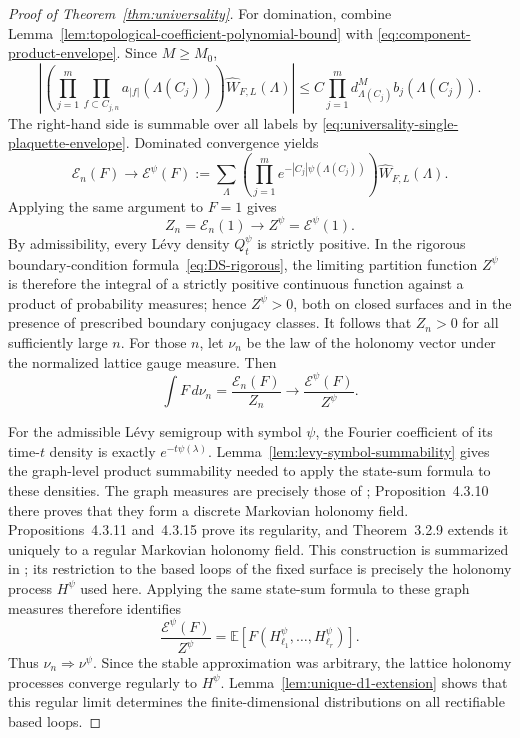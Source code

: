 \documentclass[11pt,a4paper,reqno]{article}
\theoremstyle{definition}
\theoremstyle{remark}
\begin{document}
\begin{proof}[Proof of Theorem~\ref{thm:universality}]
For domination, combine
Lemma~\ref{lem:topological-coefficient-polynomial-bound} with
\eqref{eq:component-product-envelope}. Since $M\geq M_0$,
\[
\left|
 \left(
 \prod_{j=1}^m\prod_{f\subset C_{j,n}}
 a_{|f|}(\Lambda(C_j))
 \right)
 \widehat W_{F,L}(\Lambda)
\right|
\leq
 C\prod_{j=1}^m
 d_{\Lambda(C_j)}^M b_j(\Lambda(C_j)).
\]
The right-hand side is summable over all labels by
\eqref{eq:universality-single-plaquette-envelope}. Dominated convergence
yields
\[
 \mathcal E_n(F)
 \longrightarrow
 \mathcal E^\psi(F)
 :=
 \sum_\Lambda
 \left(
 \prod_{j=1}^m
 e^{-|C_j|\psi(\Lambda(C_j))}
 \right)
 \widehat W_{F,L}(\Lambda).
\]
Applying the same argument to $F=1$ gives
\[
 Z_n=\mathcal E_n(1)
 \longrightarrow
 Z^\psi=\mathcal E^\psi(1).
\]
By admissibility, every L\'evy density $Q_t^\psi$ is strictly positive. In the rigorous boundary-condition formula~\eqref{eq:DS-rigorous}, the limiting partition function $Z^\psi$ is therefore the integral of a strictly positive continuous function against a product of probability measures; hence $Z^\psi>0$, both on closed surfaces and in the presence of prescribed boundary conjugacy classes. It follows that $Z_n>0$ for all sufficiently large $n$. For those $n$, let $\nu_n$ be the law of the holonomy vector under the normalized lattice gauge measure. Then
\[
 \int F\,d\nu_n
 =
 \frac{\mathcal E_n(F)}{Z_n}
 \longrightarrow
 \frac{\mathcal E^\psi(F)}{Z^\psi}.
\]

For the admissible L\'evy semigroup with symbol $\psi$, the Fourier coefficient of its time-$t$ density is exactly $e^{-t\psi(\lambda)}$. Lemma~\ref{lem:levy-symbol-summability} gives the graph-level product summability needed to apply the state-sum formula to these densities. The graph measures are precisely those of \cite[Definition~4.3.2]{Lev10}; Proposition~4.3.10 there proves that they form a discrete Markovian holonomy field. Propositions~4.3.11 and~4.3.15 prove its regularity, and Theorem~3.2.9 extends it uniquely to a regular Markovian holonomy field. This construction is summarized in \cite[Theorem~4.3.1]{Lev10}; its restriction to the based loops of the fixed surface is precisely the holonomy process $H^\psi$ used here. Applying the same state-sum formula to these graph measures therefore identifies
\[
 \frac{\mathcal E^\psi(F)}{Z^\psi}
 =
 \mathbb E\left[
 F(H^\psi_{\ell_1},\ldots,H^\psi_{\ell_r})
 \right].
\]
Thus $\nu_n\Rightarrow\nu^\psi$. Since the stable approximation was arbitrary, the lattice holonomy processes converge regularly to $H^\psi$. Lemma~\ref{lem:unique-d1-extension} shows that this regular limit determines the finite-dimensional distributions on all rectifiable based loops.
\end{proof}
\end{document}
